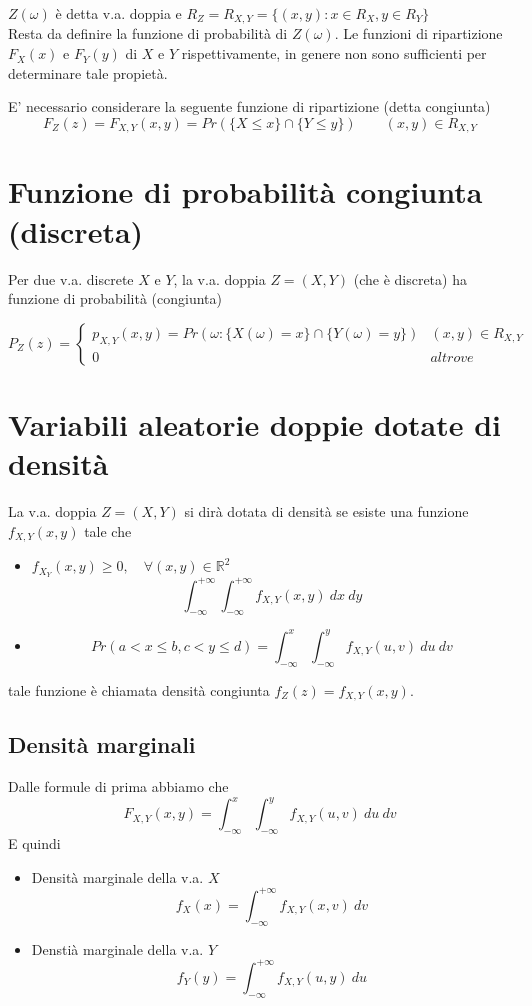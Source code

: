 \documentclass[a4paper]{report}
\begin{document}
    $Z(\omega)$ è detta v.a. doppia e $R_Z = R_{X,Y} = \{(x,y):x \in R_X,y \in R_Y\}$\\

  Resta da definire la funzione di probabilità di $Z(\omega)$. Le funzioni di ripartizione $F_X(x)$ e $F_Y(y)$ di $X$ e $Y$ rispettivamente, in genere non sono sufficienti per determinare tale propietà.

    E' necessario considerare la seguente funzione di ripartizione (detta congiunta)
  \[ F_Z(z) = F_{X,Y}(x,y) = Pr(\{ X \leqslant x\} \cap \{ Y \leqslant y \}) \quad\quad (x,y)\in R_{X,Y} \]

  \section{Funzione di probabilità congiunta (discreta)}
  Per due v.a. discrete $X$ e $Y$, la v.a. doppia $Z=(X,Y)$ (che è discreta) ha funzione di probabilità (congiunta)

  \[
    P_Z(z) =
    \begin{cases}
      p_{X,Y}(x,y) = Pr(\omega : \{ X(\omega) = x \} \cap \{ Y(\omega) = y \}) & (x,y) \in R_{X,Y}\\
      0 & altrove
    \end{cases}
  \]

  \section{Variabili aleatorie doppie dotate di densità}
  La v.a. doppia $Z= (X,Y)$ si dirà dotata di densità se esiste una funzione $f_{X,Y}(x,y)$ tale che
  \begin{itemize}
    \item $f_{X_Y}(x,y) \geq 0, \quad \forall (x,y) \in \mathbb{R}^2$
    \[ \int_{-\infty}^{+\infty}\int_{-\infty}^{+\infty} f_{X,Y}(x,y)\: dx\: dy \]
    \item \[Pr(a < x \leqslant b, c < y \leqslant d) = \int_{-\infty}^{x}\int_{-\infty}^{y} f_{X,Y}(u,v)\: du\: dv \]

  \end{itemize}
  tale funzione è chiamata densità congiunta $f_Z(z) = f_{X,Y}(x,y)$.

  \subsection{Densità marginali}
  Dalle formule di prima abbiamo che
  \[ F_{X,Y}(x,y) = \int_{-\infty}^{x}\int_{-\infty}^{y} f_{X,Y}(u,v)\: du\: dv\]
    E quindi
  \begin{itemize}
    \item Densità marginale della v.a. $X$ \[f_X(x) = \int_{-\infty}^{+\infty} f_{X,Y}(x,v)\: dv\]
    \item Denstià marginale della v.a. $Y$ \[f_Y(y) = \int_{-\infty}^{+\infty} f_{X,Y}(u,y)\: du\]
  \end{itemize}
\end{document}

